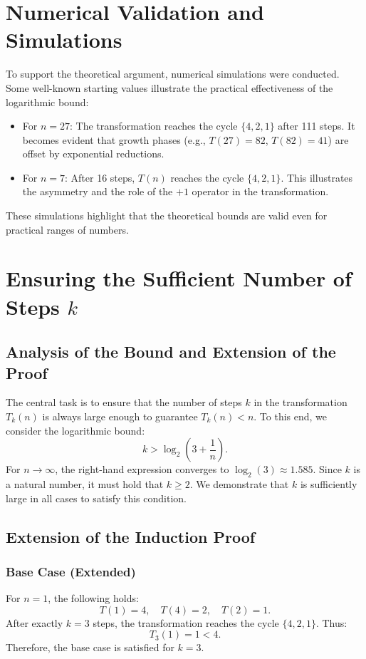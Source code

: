 \documentclass[a4paper,12pt]{article}
\begin{document}
\section{Numerical Validation and Simulations}
To support the theoretical argument, numerical simulations were conducted. Some well-known starting values illustrate the practical effectiveness of the logarithmic bound:

\begin{itemize}
    \item For \( n = 27 \): The transformation reaches the cycle \( \{4, 2, 1\} \) after 111 steps. It becomes evident that growth phases (e.g., \( T(27) = 82 \), \( T(82) = 41 \)) are offset by exponential reductions.
    \item For \( n = 7 \): After 16 steps, \( T(n) \) reaches the cycle \( \{4, 2, 1\} \). This illustrates the asymmetry and the role of the \(+1\) operator in the transformation.
\end{itemize}

These simulations highlight that the theoretical bounds are valid even for practical ranges of numbers.

\section{Ensuring the Sufficient Number of Steps \( k \)}

\subsection{Analysis of the Bound and Extension of the Proof}
The central task is to ensure that the number of steps \( k \) in the transformation \( T_k(n) \) is always large enough to guarantee \( T_k(n) < n \). To this end, we consider the logarithmic bound:
\[
k > \log_2\left(3 + \frac{1}{n}\right).
\]
For \( n \to \infty \), the right-hand expression converges to \( \log_2(3) \approx 1.585 \). Since \( k \) is a natural number, it must hold that \( k \geq 2 \). We demonstrate that \( k \) is sufficiently large in all cases to satisfy this condition.

\subsection{Extension of the Induction Proof}
\subsubsection{Base Case (Extended)}
For \( n = 1 \), the following holds:
\[
T(1) = 4, \quad T(4) = 2, \quad T(2) = 1.
\]
After exactly \( k = 3 \) steps, the transformation reaches the cycle \( \{4, 2, 1\} \). Thus:
\[
T_3(1) = 1 < 4.
\]
Therefore, the base case is satisfied for \( k = 3 \).
\end{document}

